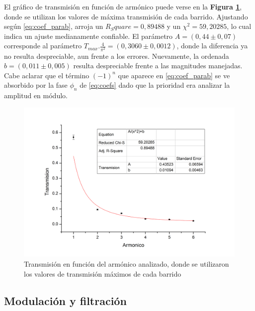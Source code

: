 \documentclass[11pt,a4paper]{article}
\begin{document}
El gráfico de transmisión en función de armónico puede verse en la \textbf{Figura \ref{fig:transparab}}, donde se utilizan los valores de máxima transmisión de cada barrido. Ajustando según \eqref{eq:coef_parab}, arroja un $R_Square = 0,89488$ y un $\chi^2 = 59,20285$, lo cual indica un ajuste medianamente confiable. El parámetro $A = (0,44 \pm 0,07)$ corresponde al parámetro $T_{max}.\frac{4}{\pi^2} = (0,3060 \pm 0,0012)$, donde la diferencia ya no resulta despreciable, aun frente a los errores. Nuevamente, la ordenada $b = (0,011 \pm 0,005)$ resulta despreciable frente a las magnitudes manejadas. Cabe aclarar que el término $(-1)^n$ que aparece en \eqref{eq:coef_parab} se ve absorbido por la fase $\phi_n$ de \eqref{eq:coefs} dado que la prioridad era analizar la amplitud en módulo. 

\begin{figure}[h]
\centering
\includegraphics[scale=0.6]{Trans_vs_Arm_Parab}
\caption{Transmisión en función del armónico analizado, donde se utilizaron los valores de transmisión máximos de cada barrido}
\label{fig:transparab}
\end{figure}


\subsection{Modulación y filtración}



\end{document}
